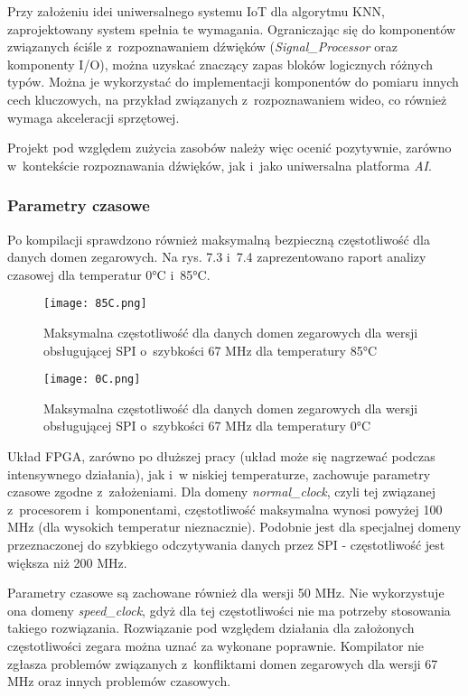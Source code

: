 Przy założeniu idei uniwersalnego systemu IoT dla algorytmu KNN, zaprojektowany system spełnia te wymagania. Ograniczając się do komponentów związanych ściśle z~rozpoznawaniem dźwięków (\textit{Signal\_Processor} oraz komponenty I/O), można uzyskać znaczący zapas bloków logicznych różnych typów. Można je wykorzystać do implementacji komponentów do pomiaru innych cech kluczowych, na przykład związanych z~rozpoznawaniem wideo, co również wymaga akceleracji sprzętowej.

Projekt pod względem zużycia zasobów należy więc ocenić pozytywnie, zarówno w~kontekście rozpoznawania dźwięków, jak i~jako uniwersalna platforma \textit{AI}.

\subsubsection{Parametry czasowe}

Po kompilacji sprawdzono również maksymalną bezpieczną częstotliwość dla danych domen zegarowych. Na rys. 7.3 i~7.4 zaprezentowano raport analizy czasowej dla temperatur 0°C i~85°C.

\begin{figure}[h]
	\centering
	\texttt{[image: 85C.png]}
	\caption{Maksymalna częstotliwość dla danych domen zegarowych dla wersji obsługującej SPI o~szybkości 67 MHz dla temperatury 85°C}
\end{figure}
\FloatBarrier %

\begin{figure}[h]
	\centering
	\texttt{[image: 0C.png]}
	\caption{Maksymalna częstotliwość dla danych domen zegarowych dla wersji obsługującej SPI o~szybkości 67 MHz dla temperatury 0°C}
\end{figure}
\FloatBarrier %

Układ FPGA, zarówno po dłuższej pracy (układ może się nagrzewać podczas intensywnego działania), jak i~w niskiej temperaturze, zachowuje parametry czasowe zgodne z~założeniami. Dla domeny \textit{normal\_clock}, czyli tej związanej z~procesorem i~komponentami, częstotliwość maksymalna wynosi powyżej 100 MHz (dla wysokich temperatur nieznacznie). Podobnie jest dla specjalnej domeny przeznaczonej do szybkiego odczytywania danych przez SPI - częstotliwość jest większa niż 200 MHz.

Parametry czasowe są zachowane również dla wersji 50 MHz. Nie wykorzystuje ona domeny \textit{speed\_clock}, gdyż dla tej częstotliwości nie ma potrzeby stosowania takiego rozwiązania. Rozwiązanie pod względem działania dla założonych częstotliwości zegara można uznać za wykonane poprawnie. Kompilator nie zgłasza problemów związanych z~konfliktami domen zegarowych dla wersji 67 MHz oraz innych problemów czasowych.

